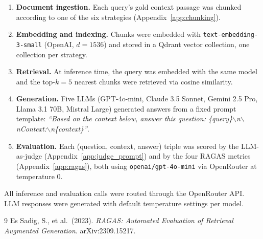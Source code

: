 \documentclass[12pt]{article}
\begin{document}
\begin{enumerate}
  \item \textbf{Document ingestion.} Each query's gold context passage was
    chunked according to one of the six strategies
    (Appendix~\ref{app:chunking}).
  \item \textbf{Embedding and indexing.} Chunks were embedded with
    \texttt{text-embedding-3-small} (OpenAI, $d = 1536$) and stored in a
    Qdrant vector collection, one collection per strategy.
  \item \textbf{Retrieval.} At inference time, the query was embedded with
    the same model and the top-$k = 5$ nearest chunks were retrieved via
    cosine similarity.
  \item \textbf{Generation.} Five LLMs (GPT-4o-mini, Claude 3.5 Sonnet,
    Gemini 2.5 Pro, Llama 3.1 70B, Mistral Large) generated answers from a
    fixed prompt template: \textit{``Based on the context below, answer this
    question: \{query\}$\backslash$n$\backslash$nContext:$\backslash$n\{context\}''}.
  \item \textbf{Evaluation.} Each (question, context, answer) triple was
    scored by the LLM-as-judge (Appendix~\ref{app:judge_prompt}) and by the
    four RAGAS metrics (Appendix~\ref{app:ragas}), both using
    \texttt{openai/gpt-4o-mini} via OpenRouter at temperature 0.
\end{enumerate}

All inference and evaluation calls were routed through the OpenRouter API.
LLM responses were generated with default temperature settings per model.
 
\begin{thebibliography}{9}
Es Sadig, S., et al.\ (2023).
\textit{RAGAS: Automated Evaluation of Retrieval Augmented Generation}.
arXiv:2309.15217.
\end{thebibliography}
\end{document}
